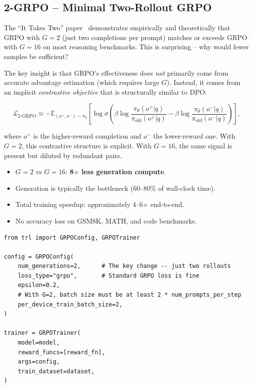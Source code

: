 \subsection{2-GRPO -- Minimal Two-Rollout GRPO}
\label{sec:2grpo}

\begin{intuitionbox}
The ``It Takes Two'' paper~\cite{xu2025twograpo} demonstrates empirically and theoretically that GRPO with $G=2$ (just two completions per prompt) matches or exceeds GRPO with $G=16$ on most reasoning benchmarks. This is surprising -- why would fewer samples be sufficient?
\end{intuitionbox}

The key insight is that GRPO’s effectiveness does \emph{not} primarily come from accurate advantage estimation (which requires large $G$). Instead, it comes from an implicit \emph{contrastive objective} that is structurally similar to DPO:

\[
\mathcal{L}_{\text{2-GRPO}} \approx
  -\mathbb{E}_{(o^+, o^-) \sim \pi_\theta}\!\left[
    \log \sigma\!\left(
      \beta \log \frac{\pi_\theta(o^+|q)}{\pi_{\text{old}}(o^+|q)}
      - \beta \log \frac{\pi_\theta(o^-|q)}{\pi_{\text{old}}(o^-|q)}
    \right)
  \right],
\]

where $o^+$ is the higher-reward completion and $o^-$ the lower-reward one. With $G=2$, this contrastive structure is explicit. With $G=16$, the same signal is present but diluted by redundant pairs.

\begin{keybox}
\begin{itemize}
  \item $G=2$ vs $G=16$: \textbf{8$\times$ less generation compute}.
  \item Generation is typically the bottleneck (60--80\% of wall-clock time).
  \item Total training speedup: approximately 4--6$\times$ end-to-end.
  \item No accuracy loss on GSM8K, MATH, and code benchmarks.
\end{itemize}
\end{keybox}

\begin{examplebox}
\begin{lstlisting}[style=pythonstyle]
from trl import GRPOConfig, GRPOTrainer

config = GRPOConfig(
    num_generations=2,      # The key change -- just two rollouts
    loss_type="grpo",       # Standard GRPO loss is fine
    epsilon=0.2,
    # With G=2, batch size must be at least 2 * num_prompts_per_step
    per_device_train_batch_size=2,
)

trainer = GRPOTrainer(
    model=model,
    reward_funcs=[reward_fn],
    args=config,
    train_dataset=dataset,
)
\end{lstlisting}
\end{examplebox}

